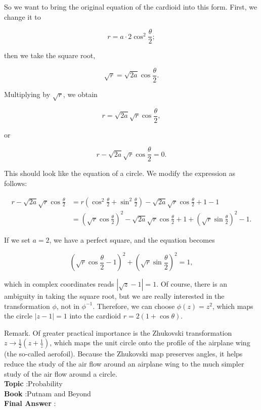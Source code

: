 \documentclass[10pt]{article}
\begin{document}
So we want to bring the original equation of the cardioid into this form. First, we change it to

$$
r=a \cdot 2 \cos ^{2} \frac{\theta}{2} ;
$$

then we take the square root,

$$
\sqrt{r}=\sqrt{2 a} \cos \frac{\theta}{2} .
$$

Multiplying by $\sqrt{r}$, we obtain

$$
r=\sqrt{2 a} \sqrt{r} \cos \frac{\theta}{2},
$$

or

$$
r-\sqrt{2 a} \sqrt{r} \cos \frac{\theta}{2}=0 .
$$

This should look like the equation of a circle. We modify the expression as follows:

$$
\begin{aligned}
r-\sqrt{2 a} \sqrt{r} \cos \frac{\theta}{2} &=r\left(\cos ^{2} \frac{\theta}{2}+\sin ^{2} \frac{\theta}{2}\right)-\sqrt{2 a} \sqrt{r} \cos \frac{\theta}{2}+1-1 \\
&=\left(\sqrt{r} \cos \frac{\theta}{2}\right)^{2}-\sqrt{2 a} \sqrt{r} \cos \frac{\theta}{2}+1+\left(\sqrt{r} \sin \frac{\theta}{2}\right)^{2}-1 .
\end{aligned}
$$

If we set $a=2$, we have a perfect square, and the equation becomes

$$
\left(\sqrt{r} \cos \frac{\theta}{2}-1\right)^{2}+\left(\sqrt{r} \sin \frac{\theta}{2}\right)^{2}=1,
$$

which in complex coordinates reads $|\sqrt{z}-1|=1$. Of course, there is an ambiguity in taking the square root, but we are really interested in the transformation $\phi$, not in $\phi^{-1}$. Therefore, we can choose $\phi(z)=z^{2}$, which maps the circle $|z-1|=1$ into the cardioid $r=2(1+\cos \theta)$.

Remark. Of greater practical importance is the Zhukovski transformation $z \rightarrow \frac{1}{2}\left(z+\frac{1}{z}\right)$, which maps the unit circle onto the profile of the airplane wing (the so-called aerofoil). Because the Zhukovski map preserves angles, it helps reduce the study of the air flow around an airplane wing to the much simpler study of the air flow around a circle.
\\
\textbf{Topic} :Probability\\
\textbf{Book} :Putnam and Beyond\\
\textbf{Final Answer} :\\
\end{document}
